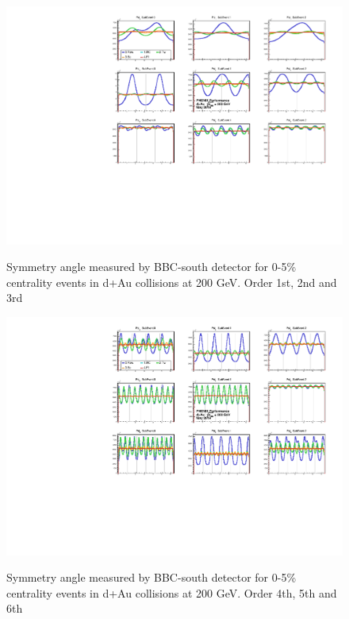 \documentclass{article}
\begin{document}
\begin{figure}
\includegraphics[width=\textwidth]{fig_eventplane/BBC123.pdf}
\label{fig.bbc123}
\caption{Symmetry angle measured by BBC-south detector for 0-5\% centrality events in d+Au collisions at 200 GeV. Order 1st, 2nd and 3rd}
\end{figure}
\begin{figure}
\includegraphics[width=\textwidth]{fig_eventplane/BBC456.pdf}
\label{fig.bbc456}
\caption{Symmetry angle measured by BBC-south detector for 0-5\% centrality events in d+Au collisions at 200 GeV. Order 4th, 5th and 6th}
\end{figure}

{}

\end{document}
